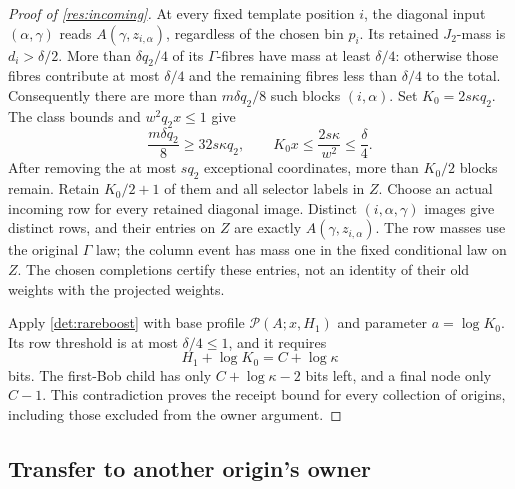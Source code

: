 \documentclass[11pt]{article} \usepackage[utf8]{inputenc}
\theoremstyle{plain} \newtheorem{theorem}{Theorem}[section]
\theoremstyle{definition} \newaliascnt{definition}{theorem}
\newcommand{\RP}[3]{\mathcal{P}(#1;#2,#3)}
\begin{document}
\begin{proof}[Proof of \cref{res:incoming}]
At every fixed template position $i$, the diagonal input $(\alpha,\gamma)$
reads $A(\gamma,z_{i,\alpha})$, regardless of the chosen bin $p_i$. Its retained
$J_2$-mass is $d_i>\delta/2$. More than $\delta q_2/4$ of its $\Gamma$-fibres
have mass at least $\delta/4$: otherwise those fibres contribute at most
$\delta/4$ and the remaining fibres less than $\delta/4$ to the total.
Consequently there are more than $m\delta q_2/8$ such blocks $(i,\alpha)$.
Set $K_0=2s\kappa q_2$. The class bounds and $w^2q_2x\le1$ give
\[
\frac{m\delta q_2}{8}\ge32s\kappa q_2,
\qquad
K_0x\le\frac{2s\kappa}{w^2}\le\frac\delta4.
\]
After removing the at most $sq_2$ exceptional coordinates, more than $K_0/2$
blocks remain. Retain $K_0/2+1$ of them and all selector labels in $Z$.
Choose an actual incoming row for every retained diagonal image. Distinct
$(i,\alpha,\gamma)$ images give distinct rows, and their entries on $Z$ are
exactly $A(\gamma,z_{i,\alpha})$. The row masses use the original $\Gamma$
law; the column event has mass one in the fixed conditional law on $Z$.
The chosen completions certify these entries, not an identity of their old
weights with the projected weights.

Apply \cref{det:rareboost} with base profile $\RP{A}{x}{H_1}$ and parameter
$a=\log K_0$. Its row threshold is at most $\delta/4\le1$, and it requires
\[
H_1+\log K_0=C+\log\kappa
\]
bits. The first-Bob child has only $C+\log\kappa-2$ bits left, and a final
node only $C-1$. This contradiction proves the receipt bound for every
collection of origins, including those excluded from the owner argument.
\end{proof}

\subsection{Transfer to another origin's owner}
\end{document}
